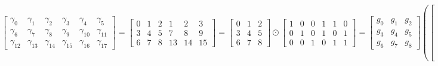 \documentclass{article}%
\begin{document}
\[%
\left[\begin{matrix}\gamma_{0} & \gamma_{1} & \gamma_{2} & \gamma_{3} & \gamma_{4} & \gamma_{5}\\\gamma_{6} & \gamma_{7} & \gamma_{8} & \gamma_{9} & \gamma_{10} & \gamma_{11}\\\gamma_{12} & \gamma_{13} & \gamma_{14} & \gamma_{15} & \gamma_{16} & \gamma_{17}\end{matrix}\right] = \left[\begin{matrix}0 & 1 & 2 & 1 & 2 & 3\\3 & 4 & 5 & 7 & 8 & 9\\6 & 7 & 8 & 13 & 14 & 15\end{matrix}\right] = \left[\begin{matrix}0 & 1 & 2\\3 & 4 & 5\\6 & 7 & 8\end{matrix}\right] \odot \left[\begin{matrix}1 & 0 & 0 & 1 & 1 & 0\\0 & 1 & 0 & 1 & 0 & 1\\0 & 0 & 1 & 0 & 1 & 1\end{matrix}\right] = \left[\begin{matrix}g_{0} & g_{1} & g_{2}\\g_{3} & g_{4} & g_{5}\\g_{6} & g_{7} & g_{8}\end{matrix}\right] \left( \left[\begin{matrix}1\\1\\1\\1\\1\\1\end{matrix}\right] \odot \left[\begin{matrix}1 & 0 & 0\\0 & 1 & 0\\0 & 0 & 1\\1 & 1 & 0\\1 & 0 & 1\\0 & 1 & 1\end{matrix}\right] \right)^t%
\]%
\end{document}
